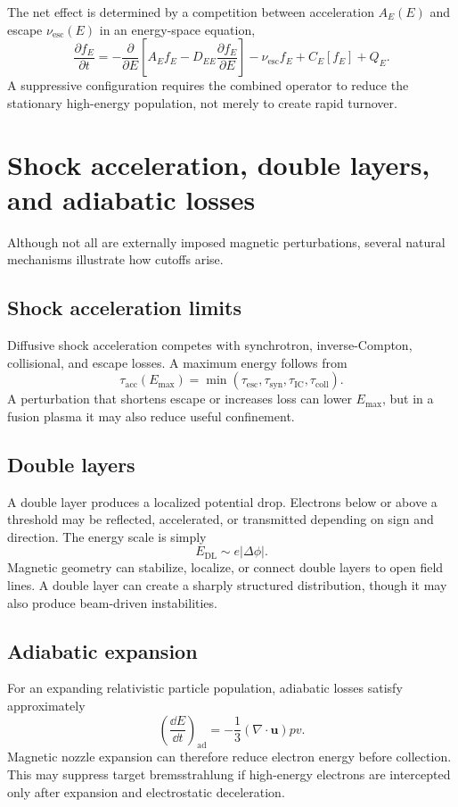 The net effect is determined by a competition between acceleration $A_E(E)$ and escape $\nu_{\mathrm{esc}}(E)$ in an energy-space equation,
\begin{equation}
\frac{\partial f_E}{\partial t}
=-\frac{\partial}{\partial E}\left[A_E f_E-D_{EE}\frac{\partial f_E}{\partial E}\right]
-\nu_{\mathrm{esc}}f_E+C_E[f_E]+Q_E.
\label{eq:energy-fp}
\end{equation}
A suppressive configuration requires the combined operator to reduce the stationary high-energy population, not merely to create rapid turnover.

\section{Shock acceleration, double layers, and adiabatic losses}

Although not all are externally imposed magnetic perturbations, several natural mechanisms illustrate how cutoffs arise.

\subsection{Shock acceleration limits}
Diffusive shock acceleration competes with synchrotron, inverse-Compton, collisional, and escape losses. A maximum energy follows from
\begin{equation}
\tau_{\mathrm{acc}}(E_{\max})
=\min\left(\tau_{\mathrm{esc}},\tau_{\mathrm{syn}},\tau_{\mathrm{IC}},\tau_{\mathrm{coll}}\right).
\end{equation}
A perturbation that shortens escape or increases loss can lower $E_{\max}$, but in a fusion plasma it may also reduce useful confinement.

\subsection{Double layers}
A double layer produces a localized potential drop. Electrons below or above a threshold may be reflected, accelerated, or transmitted depending on sign and direction. The energy scale is simply
\begin{equation}
E_{\mathrm{DL}}\sim e|\Delta\phi|.
\end{equation}
Magnetic geometry can stabilize, localize, or connect double layers to open field lines. A double layer can create a sharply structured distribution, though it may also produce beam-driven instabilities.

\subsection{Adiabatic expansion}
For an expanding relativistic particle population, adiabatic losses satisfy approximately
\begin{equation}
\left(\frac{\dd E}{\dd t}\right)_{\mathrm{ad}}
=-\frac{1}{3}(\nabla\cdot\mathbf{u})p v.
\end{equation}
Magnetic nozzle expansion can therefore reduce electron energy before collection. This may suppress target bremsstrahlung if high-energy electrons are intercepted only after expansion and electrostatic deceleration.

